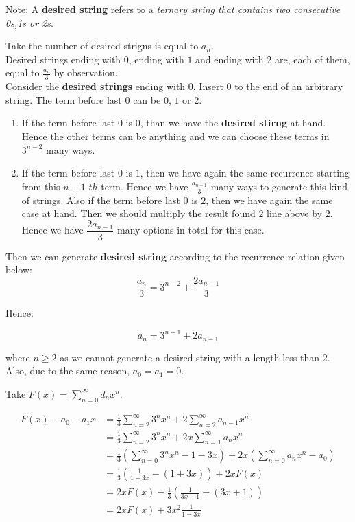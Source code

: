 \documentclass[12pt]{article}
\begin{document}
Note: A \textbf{desired string} refers to a \textit{ternary string that contains two consecutive 0s,1s or 2s}.

Take the number of desired strigns is equal to $a_n$.\\

Desired strings ending with $0$, ending with $1$ and ending with $2$ are, each of them, equal to $\frac{a_n}{3}$ by observation.\\

Consider the \textbf{desired strings} ending with $0$. Insert $0$ to the end of an arbitrary string. The term before last $0$ can be $0$, $1$ or $2$.

\begin{enumerate}
\item
If the term before last $0$ is $0$, than we have the \textbf{desired stirng} at hand. Hence the other terms can be anything and we can choose these terms in $3^{n-2}$ many ways.
\item
If the term before last $0$ is $1$, then we have again the same recurrence starting from this $n-1$ $th$ term. Hence we have $\frac{a_{n-1}}{3}$ many ways to generate this kind of strings. Also if the term before last $0$ is $2$, then we have again the same case at hand. Then we should multiply the result found $2$ line above by $2$. Hence we have $\dfrac{2a_{n-1}}{3}$ many options in total for this case.
\end{enumerate}

Then we can generate \textbf{desired string} according to the recurrence relation given below:\\

$$\frac{a_n}{3}=3^{n-2}+\frac{2a_{n-1}}{3}$$

Hence:

$$a_n=3^{n-1}+2a_{n-1}$$

where $n\geq 2$ as we cannot generate a desired string with a length less than $2$. Also, due to the same reason, $a_0=a_1=0$.

Take $F(x)=\sum_{n=0}^{\infty}d_n x^n$.

\begin{align*}
F(x)-a_0-a_1 x &= \frac{1}{3} \sum_{n=2}^{\infty} 3^n x^n + 2\sum_{n=2}^{\infty} a_{n-1} x^n \\
			   &= \frac{1}{3} \sum_{n=2}^{\infty} 3^n x^n + 2x\sum_{n=1}^{\infty} a_n x^n \\
			   &= \frac{1}{3}\left(\sum_{n=0}^{\infty} 3^n x^n -1 -3x\right) + 2x\left(\sum_{n=0}^{\infty} a_n x^n - a_0\right) \\
			   &= \frac{1}{3} \left(\frac{1}{1-3x}-(1+3x)\right) + 2x F(x) \\
			   &= 2x F(x) - \frac{1}{3} \left(\frac{1}{3x-1}+(3x+1)\right) \\
			   &= 2x F(x) + 3 x^2 \frac{1}{1-3x} \\
\end{align*}
\end{document}
